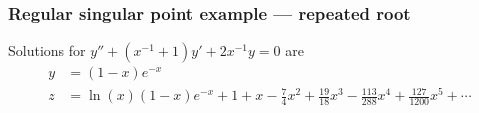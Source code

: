 \documentclass[9pt]{beamer}
\begin{document}
\begin{frame}[t]
 \frametitle{Regular singular point example --- repeated root}

 Solutions for $y''+(x^{-1}+1)y'+2x^{-1}y=0$ are
 \begin{align*}
  y &= (1-x)e^{-x} \\
  z &= \ln(x)(1-x)e^{-x} + 
        1 + x - \frac{7}{4}x^2 + \frac{19}{18}x^3 
        -\frac{113}{288}x^4 + \frac{127}{1200} x^5 + \dotsb \\
 \end{align*}

 \begin{center}
\end{center}
\end{frame}
\end{document}

